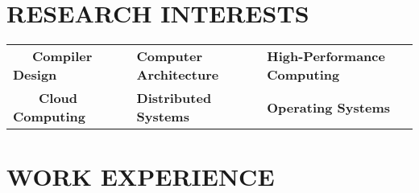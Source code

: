 \documentclass[11pt,a4paper,sans]{moderncv}        %
\begin{document}
\section{RESEARCH INTERESTS}
\vspace{4pt}
\small{
    \begin{tabular}
        {l@{\hskip 14mm}l@{\hskip 14mm}l}
        \vspace{6pt}
        ~~~\textbf{\large Compiler Design} & \textbf{\large Computer Architecture} & \textbf{\large High-Performance Computing} \\
        ~~~~\textbf{\large Cloud Computing} &  \textbf{\large Distributed Systems} &
        \textbf{\large Operating Systems}
    \end{tabular}
    \medskip
} %





\section{WORK EXPERIENCE}
\end{document}
